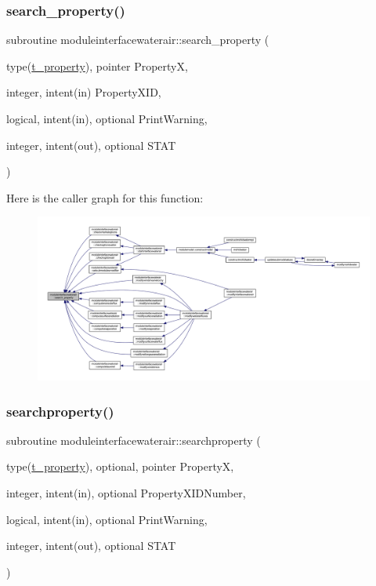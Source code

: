 \subsubsection{\texorpdfstring{search\+\_\+property()}{search\_property()}}
{\footnotesize\ttfamily subroutine moduleinterfacewaterair\+::search\+\_\+property (\begin{DoxyParamCaption}\item[{type(\mbox{\hyperlink{structmoduleinterfacewaterair_1_1t__property}{t\+\_\+property}}), pointer}]{PropertyX,  }\item[{integer, intent(in)}]{Property\+X\+ID,  }\item[{logical, intent(in), optional}]{Print\+Warning,  }\item[{integer, intent(out), optional}]{S\+T\+AT }\end{DoxyParamCaption})\hspace{0.3cm}{\ttfamily [private]}}

Here is the caller graph for this function\+:\nopagebreak
\begin{figure}[H]
\begin{center}
\leavevmode
\includegraphics[width=350pt]{namespacemoduleinterfacewaterair_abba77353f44ae39342d577e54d38ad95_icgraph}
\end{center}
\end{figure}
\mbox{\label{namespacemoduleinterfacewaterair_a9b32248d73ce68c55c1d8671b779f48a}} 
\subsubsection{\texorpdfstring{searchproperty()}{searchproperty()}}
{\footnotesize\ttfamily subroutine moduleinterfacewaterair\+::searchproperty (\begin{DoxyParamCaption}\item[{type(\mbox{\hyperlink{structmoduleinterfacewaterair_1_1t__property}{t\+\_\+property}}), optional, pointer}]{PropertyX,  }\item[{integer, intent(in), optional}]{Property\+X\+I\+D\+Number,  }\item[{logical, intent(in), optional}]{Print\+Warning,  }\item[{integer, intent(out), optional}]{S\+T\+AT }\end{DoxyParamCaption})\hspace{0.3cm}{\ttfamily [private]}}

